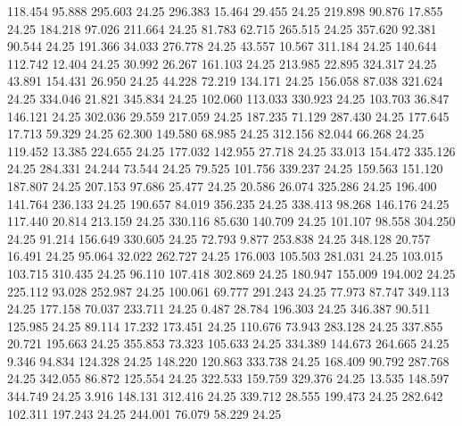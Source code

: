  118.454   95.888  295.603        24.25
 296.383   15.464   29.455        24.25
 219.898   90.876   17.855        24.25
 184.218   97.026  211.664        24.25
  81.783   62.715  265.515        24.25
 357.620   92.381   90.544        24.25
 191.366   34.033  276.778        24.25
  43.557   10.567  311.184        24.25
 140.644  112.742   12.404        24.25
  30.992   26.267  161.103        24.25
 213.985   22.895  324.317        24.25
  43.891  154.431   26.950        24.25
  44.228   72.219  134.171        24.25
 156.058   87.038  321.624        24.25
 334.046   21.821  345.834        24.25
 102.060  113.033  330.923        24.25
 103.703   36.847  146.121        24.25
 302.036   29.559  217.059        24.25
 187.235   71.129  287.430        24.25
 177.645   17.713   59.329        24.25
  62.300  149.580   68.985        24.25
 312.156   82.044   66.268        24.25
 119.452   13.385  224.655        24.25
 177.032  142.955   27.718        24.25
  33.013  154.472  335.126        24.25
 284.331   24.244   73.544        24.25
  79.525  101.756  339.237        24.25
 159.563  151.120  187.807        24.25
 207.153   97.686   25.477        24.25
  20.586   26.074  325.286        24.25
 196.400  141.764  236.133        24.25
 190.657   84.019  356.235        24.25
 338.413   98.268  146.176        24.25
 117.440   20.814  213.159        24.25
 330.116   85.630  140.709        24.25
 101.107   98.558  304.250        24.25
  91.214  156.649  330.605        24.25
  72.793    9.877  253.838        24.25
 348.128   20.757   16.491        24.25
  95.064   32.022  262.727        24.25
 176.003  105.503  281.031        24.25
 103.015  103.715  310.435        24.25
  96.110  107.418  302.869        24.25
 180.947  155.009  194.002        24.25
 225.112   93.028  252.987        24.25
 100.061   69.777  291.243        24.25
  77.973   87.747  349.113        24.25
 177.158   70.037  233.711        24.25
   0.487   28.784  196.303        24.25
 346.387   90.511  125.985        24.25
  89.114   17.232  173.451        24.25
 110.676   73.943  283.128        24.25
 337.855   20.721  195.663        24.25
 355.853   73.323  105.633        24.25
 334.389  144.673  264.665        24.25
   9.346   94.834  124.328        24.25
 148.220  120.863  333.738        24.25
 168.409   90.792  287.768        24.25
 342.055   86.872  125.554        24.25
 322.533  159.759  329.376        24.25
  13.535  148.597  344.749        24.25
   3.916  148.131  312.416        24.25
 339.712   28.555  199.473        24.25
 282.642  102.311  197.243        24.25
 244.001   76.079   58.229        24.25
